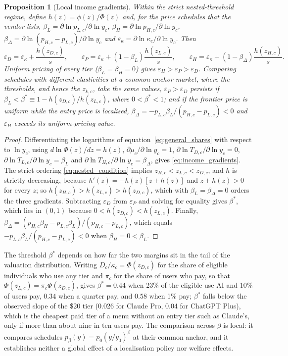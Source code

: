 \documentclass[11pt]{article}
\newtheorem{aproposition}{Proposition}[section]
\theoremstyle{definition}
\theoremstyle{remark}
\begin{document}
\begin{aproposition}[Local income gradients]\label{prop:margins}
Within the strict nested-threshold regime, define $h(z)=\phi(z)/\Phi(z)$ and, for the price schedules that the vendor lists, $\beta_L=\partial\ln p_{L,c}/\partial\ln y_c$, $\beta_H=\partial\ln p_{H,c}/\partial\ln y_c$, $\beta_{\Delta}=\partial\ln(p_{H,c}-p_{L,c})/\partial\ln y_c$ and $\varepsilon_\kappa=\partial\ln\kappa_c/\partial\ln y_c$. Then
\begin{equation}
 \varepsilon_D=\varepsilon_\kappa+\frac{h(z_{D,c})}{s},\qquad
 \varepsilon_P=\varepsilon_\kappa+(1-\beta_L)\frac{h(z_{L,c})}{s},\qquad
 \varepsilon_H=\varepsilon_\kappa+(1-\beta_\Delta)\frac{h(z_{H,c})}{s}.
 \label{eq:income_gradients}
\end{equation}
Uniform pricing of every tier ($\beta_L=\beta_H=0$) gives $\varepsilon_H>\varepsilon_P>\varepsilon_D$. Comparing schedules with different elasticities at a common anchor market, where the thresholds, and hence the $z_{k,c}$, take the same values, $\varepsilon_P>\varepsilon_D$ persists if $\beta_L<\beta^*\equiv1-h(z_{D,c})/h(z_{L,c})$, where $0<\beta^*<1$; and if the frontier price is uniform while the entry price is localised, $\beta_\Delta=-p_{L,c}\beta_L/(p_{H,c}-p_{L,c})<0$ and $\varepsilon_H$ exceeds its uniform-pricing value.
\end{aproposition}

\begin{proof}
Differentiating the logarithms of equation~\eqref{eq:general_shares} with respect to $\ln y_c$, using $d\ln\Phi(z)/dz=h(z)$, $\partial\mu_c/\partial\ln y_c=1$, $\partial\ln T_{D,c}/\partial\ln y_c=0$, $\partial\ln T_{L,c}/\partial\ln y_c=\beta_L$ and $\partial\ln T_{H,c}/\partial\ln y_c=\beta_\Delta$, gives \eqref{eq:income_gradients}. The strict ordering \eqref{eq:nested_condition} implies $z_{H,c}<z_{L,c}<z_{D,c}$, and $h$ is strictly decreasing, because $h'(z)=-h(z)[z+h(z)]$ and $z+h(z)>0$ for every $z$; so $h(z_{H,c})>h(z_{L,c})>h(z_{D,c})$, which with $\beta_L=\beta_\Delta=0$ orders the three gradients. Subtracting $\varepsilon_D$ from $\varepsilon_P$ and solving for equality gives $\beta^*$, which lies in $(0,1)$ because $0<h(z_{D,c})<h(z_{L,c})$. Finally, $\beta_\Delta=(p_{H,c}\beta_H-p_{L,c}\beta_L)/(p_{H,c}-p_{L,c})$, which equals $-p_{L,c}\beta_L/(p_{H,c}-p_{L,c})<0$ when $\beta_H=0<\beta_L$.
\end{proof}

The threshold $\beta^*$ depends on how far the two margins sit in the tail of the valuation distribution. Writing $D_c/\kappa_c=\Phi(z_{D,c})$ for the share of eligible individuals who use any tier and $\pi_c$ for the share of users who pay, so that $\Phi(z_{L,c})=\pi_c\Phi(z_{D,c})$, gives $\beta^*=0.44$ when 23\% of the eligible use AI and 10\% of users pay, $0.34$ when a quarter pay, and $0.58$ when 1\% pay; $\beta^*$ falls below the observed slope of the \$20 tier (0.026 for Claude Pro, 0.04 for ChatGPT Plus), which is the cheapest paid tier of a menu without an entry tier such as Claude's, only if more than about nine in ten users pay. The comparison across $\beta$ is local: it compares schedules $p_\beta(y)=p_0(y/y_0)^\beta$ at their common anchor, and it establishes neither a global effect of a localisation policy nor welfare effects.
\end{document}
